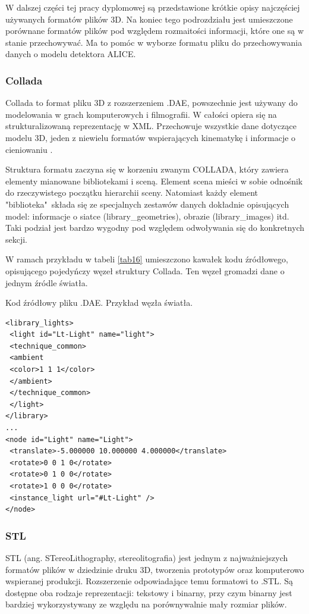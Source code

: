 W dalszej części tej pracy dyplomowej są przedstawione krótkie opisy najczęściej używanych formatów plików 3D. Na koniec tego podrozdziału jest umieszczone porównane formatów plików pod względem rozmaitości informacji, które one są w stanie przechowywać. Ma to pomóc w wyborze formatu pliku do przechowywania danych o modelu detektora ALICE.

\subsubsection{Collada}
Collada to format pliku 3D z rozszerzeniem .DAE, powszechnie jest używany do modelowania w grach komputerowych i filmografii. W całości opiera się na strukturalizowaną reprezentację w XML. Przechowuje wszystkie dane dotyczące modelu 3D, jeden z niewielu formatów wspierających kinematykę i informacje o cieniowaniu \cite{colladaInfo}.

Struktura formatu zaczyna się w korzeniu zwanym COLLADA, który zawiera elementy mianowane bibliotekami i sceną. Element scena mieści w sobie odnośnik do rzeczywistego początku hierarchii sceny. Natomiast każdy element "biblioteka"\ składa się ze specjalnych zestawów danych dokładnie opisujących model: informacje o siatce (library\_geometries), obrazie (library\_images) itd. Taki podział jest bardzo wygodny pod względem odwoływania się do konkretnych sekcji.  

W ramach przykładu w tabeli \ref{tab16} umieszczono kawałek kodu źródłowego, opisującego pojedyńczy węzeł struktury Collada. Ten węzeł gromadzi dane o jednym źródle światła.  

\begin{table}[H]
\caption{Kod źródłowy pliku .DAE. Przykład węzła światła.}
\label{tab16}
\begin{lstlisting}[frame=single]  % Start your code-block
<library_lights>
 <light id="Lt-Light" name="light">
 <technique_common>
 <ambient
 <color>1 1 1</color>
 </ambient>
 </technique_common>
 </light>
</library>
...
<node id="Light" name="Light">
 <translate>-5.000000 10.000000 4.000000</translate>
 <rotate>0 0 1 0</rotate>
 <rotate>0 1 0 0</rotate>
 <rotate>1 0 0 0</rotate>
 <instance_light url="#Lt-Light" />
</node>
\end{lstlisting}
\end{table}

\subsubsection{STL}
STL (ang. STereoLithography, stereolitografia) jest jednym z najważniejszych formatów plików w dziedzinie druku 3D, tworzenia prototypów oraz komputerowo wspieranej produkcji. Rozszerzenie odpowiadające temu formatowi to .STL. Są dostępne oba rodzaje reprezentacji: tekstowy i binarny, przy czym binarny jest bardziej wykorzystywany ze względu na porównywalnie mały rozmiar plików. 

